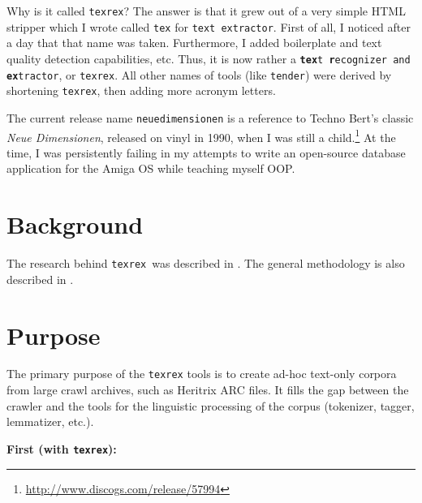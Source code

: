 \documentclass[12pt,a4paper]{article}
\newcommand{\trthis}{\texttt{texrex}}
\begin{document}
Why is it called \texttt{texrex}?
The answer is that it grew out of a very simple HTML stripper which I wrote called \texttt{tex} for \texttt{text extractor}.
First of all, I noticed after a day that that name was taken.
Furthermore, I added boilerplate and text quality detection capabilities, etc.
Thus, it is now rather a \texttt{\textbf{tex}t \textbf{r}ecognizer and \textbf{ex}tractor}, or \texttt{texrex}.
All other names of tools (like \texttt{tender}) were derived by shortening \texttt{texrex}, then adding more acronym letters.

The current release name \texttt{neuedimensionen} is a reference to Techno Bert's classic \textit{Neue Dimensionen}, released on vinyl in 1990, when I was still a child.\footnote{\url{http://www.discogs.com/release/57994}}
At the time, I was persistently failing in my attempts to write an open-source database application for the Amiga OS while teaching myself OOP.

\section*{Background}

The research behind \trthis\ was described in \cite{Schaefer-Bildhauer2012a,SchaeferEa2013,Schaefer2014}.
The general methodology is also described in \cite{SchaeferBildhauer2013}.

\pagebreak
\clearpage{}

\section{Purpose}\label{sec:purpose}

The primary purpose of the \texttt{texrex} tools is to create ad-hoc text-only corpora from large crawl archives, such as Heritrix ARC files.
It fills the gap between the crawler and the tools for the linguistic processing of the corpus (tokenizer, tagger, lemmatizer, etc.).

\vspace{0.5cm}

\textbf{First (with \texttt{texrex}):}
\end{document}
